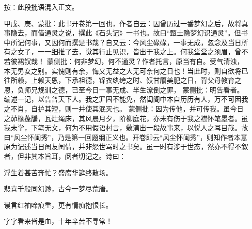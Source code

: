 
\begin{parag}
    \begin{note} \begin{subnote} 按：此段批语混入正文。\end{subnote}
        甲戌、庚、蒙批：此书开卷第一回也，作者自云：因曾历过一番梦幻之后，故将真事隐去，而借通灵之说，撰此《石头记》一书也。故曰“甄士隐梦幻识通灵”。但书中所记何事，又因何而撰是书哉？自又云：今风尘碌碌，一事无成，忽念及当日所有之女子，一一细推了去，觉其行止见识，皆出于我之上。何我堂堂之须眉，曾不若彼裙钗哉！ 蒙侧批：何非梦幻，何不通灵？作者托言，原当有自。受气清浊，本无男女之别。实愧则有余，悔又无益之大无可奈何之日也！当此时，则自欲将已往所赖，上赖天恩，下承祖德，锦衣纨绔之时、饫甘餍美肥之日，背父母教育之恩，负师兄规训之德，已至今日一事无成、半生潦倒之罪， 蒙侧批：明告看者。编述一记，以告普天下人。我之罪固不能免，然闺阁中本自历历有人，万不可因我之不肖，自护其短，则一并使其泯灭也。 蒙侧批：因为传他，并可传我。虽今日之茆椽蓬牖，瓦灶绳床，其风晨月夕，阶柳庭花，亦未有伤于我之襟怀笔墨者。虽我未学，下笔无文，何为不用假语村言，敷演出一段故事来，以悦人之耳目哉。故曰“风尘怀闺秀”，乃是第一回题纲正义也。开卷即云“风尘怀闺秀”，则知作者本意原为记述当日闺友闺情，并非怨世骂时之书矣。虽一时有涉于世态，然亦不得不叙者，但非其本旨耳，阅者切记之。诗曰：
    \end{note}

\end{parag}


\begin{poem}
    \begin{pl}\begin{note} 浮生着甚苦奔忙？盛席华筵终散场。\end{note}\end{pl}

    \begin{pl}\begin{note} 悲喜千般同幻渺，古今一梦尽荒唐。\end{note}\end{pl}

    \begin{pl}\begin{note} 谩言红袖啼痕重，更有情痴抱恨长。\end{note}\end{pl}

    \begin{pl}\begin{note} 字字看来皆是血，十年辛苦不寻常！\end{note}\end{pl}
\end{poem}


